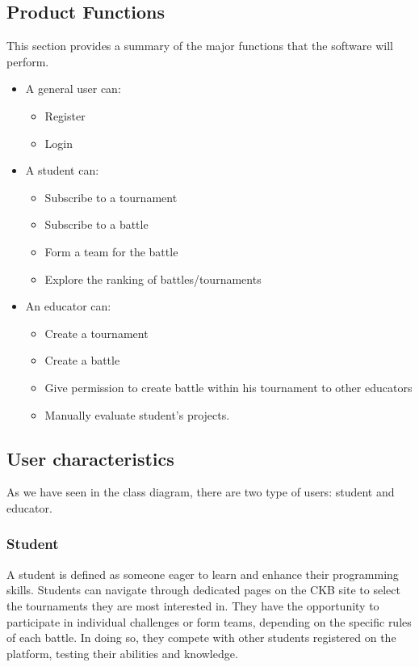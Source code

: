 \subsection{Product Functions}
This section provides  a summary of the major functions that the software will perform.\\

\begin{itemize}
    \item A general user can:
    \begin{itemize}
        \item Register
         \item Login
    \end{itemize}
\item A student can:
    \begin{itemize}
    \item Subscribe to a tournament
    \item Subscribe to a battle
    \item Form a team for the battle
    \item Explore the ranking of battles/tournaments
    \end{itemize}
\item  An educator can:
\begin{itemize}
    \item Create a tournament
    \item Create a battle
    \item Give permission to create battle within his tournament to other educators
    \item Manually evaluate student's projects.
\end{itemize}
\end{itemize}
\subsection{User characteristics}
As we have seen in the class diagram, there are two type of users: student and educator.
\subsubsection{Student}
A student is defined as someone eager to learn and enhance their programming skills. Students can navigate through dedicated pages on the CKB site to select the tournaments they are most interested in. They have the opportunity to participate in individual challenges or form teams, depending on the specific rules of each battle. In doing so, they compete with other students registered on the platform, testing their abilities and knowledge.
